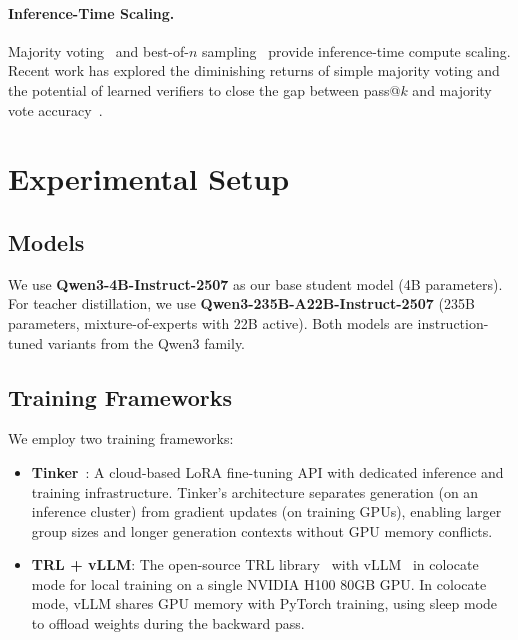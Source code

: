 \documentclass[11pt,a4paper]{article}
\newcommand{\modelname}{Qwen3-4B-Instruct}
\newcommand{\teachername}{Qwen3-235B-A22B-Instruct}
\begin{document}
\paragraph{Inference-Time Scaling.} Majority voting~\citep{wang2023selfconsistency} and best-of-$n$ sampling~\citep{cobbe2021gsm8k} provide inference-time compute scaling. Recent work has explored the diminishing returns of simple majority voting and the potential of learned verifiers to close the gap between pass@$k$ and majority vote accuracy~\citep{lightman2024lets}.

\section{Experimental Setup}
\label{sec:setup}

\subsection{Models}

We use \textbf{\modelname{}-2507} as our base student model (4B parameters). For teacher distillation, we use \textbf{\teachername{}-2507} (235B parameters, mixture-of-experts with 22B active). Both models are instruction-tuned variants from the Qwen3 family.

\subsection{Training Frameworks}

We employ two training frameworks:
\begin{itemize}[leftmargin=*]
    \item \textbf{Tinker}~\citep{tinker2025}: A cloud-based LoRA fine-tuning API with dedicated inference and training infrastructure. Tinker's architecture separates generation (on an inference cluster) from gradient updates (on training GPUs), enabling larger group sizes and longer generation contexts without GPU memory conflicts.

    \item \textbf{TRL + vLLM}: The open-source TRL library~\citep{vonwerra2022trl} with vLLM~\citep{kwon2023vllm} in colocate mode for local training on a single NVIDIA H100 80GB GPU. In colocate mode, vLLM shares GPU memory with PyTorch training, using sleep mode to offload weights during the backward pass.
\end{itemize}
\end{document}
